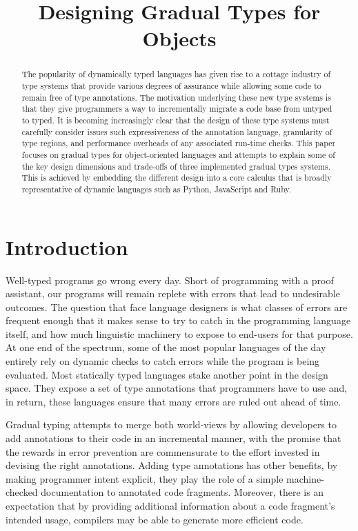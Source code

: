 \documentclass[preprint]{sigplanconf}
\begin{document}
\title{Designing Gradual Types for Objects} 
\authorinfo{}{}{} %
\maketitle

\begin{abstract}
The popularity of dynamically typed languages has given rise to a cottage
industry of type systems that provide various degrees of assurance
while allowing some code to remain free of type annotations. 
The motivation underlying these new type systems is that they give
programmers a way to incrementally migrate a code base from untyped
to typed.  It is becoming increasingly clear that the design of these
type systems must carefully consider issues such expressiveness of the 
annotation language, granularity of type regions, and performance overheads
of any associated run-time checks.  This paper focuses on gradual types for 
object-oriented languages and attempts to explain some of the key design 
dimensions and trade-offs of three implemented gradual types systems.
This is achieved by embedding the different design into a core calculus
that is broadly representative of dynamic languages such as Python, JavaScript
and Ruby.
\end{abstract} 

\section{Introduction}
Well-typed programs go wrong every day. Short of programming with a proof
assistant, our programs will remain replete with errors that lead to
undesirable outcomes.  The question that face language designers is what
classes of errors are frequent enough that it makes sense to try to catch in
the programming language itself, and how much linguistic machinery to expose
to end-users for that purpose.  At one end of the spectrum, some of the most
popular languages of the day entirely rely on dynamic checks to catch errors
while the program is being evaluated. Most statically typed languages stake
another point in the design space.  They expose a set of type annotations
that programmers have to use and, in return, these languages ensure that
many errors are ruled out ahead of time.

Gradual typing attempts to merge both world-views by allowing developers to
add annotations to their code in an incremental manner, with the promise
that the rewards in error prevention are commensurate to the effort invested
in devising the right annotations. Adding type annotations has other
benefits, by making programmer intent explicit, they play the role of a
simple machine-checked documentation to annotated code fragments.  Moreover,
there is an expectation that by providing additional information about a
code fragment's intended usage, compilers may be able to generate more
efficient code.
\end{document}
